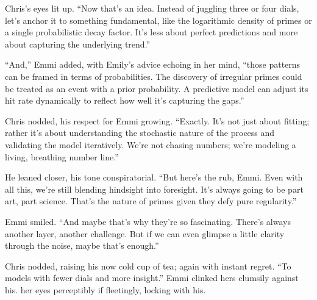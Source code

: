 Chris’s eyes lit up. “Now that’s an idea. Instead of juggling three or four dials, let’s anchor it to something fundamental, like the logarithmic density of primes or a single probabilistic decay factor. It’s less about perfect predictions and more about capturing the underlying trend.”

“And,” Emmi added, with Emily’s advice echoing in her mind, “those patterns can be framed in terms of probabilities. The discovery of irregular primes could be treated as an event with a prior probability. A predictive model can adjust its hit rate dynamically to reflect how well it’s capturing the gaps.”

Chris nodded, his respect for Emmi growing. “Exactly. It’s not just about fitting; rather it’s about understanding the stochastic nature of the process and validating the model iteratively. We’re not chasing numbers; we’re modeling a living, breathing number line.”

He leaned closer, his tone conspiratorial. “But here’s the rub, Emmi. Even with all this, we’re still blending hindsight into foresight. It’s always going to be part art, part science. That’s the nature of primes given they defy pure regularity.”

Emmi smiled. “And maybe that’s why they’re so fascinating. There’s always another layer, another challenge. But if we can even glimpse a little clarity through the noise, maybe that’s enough.”

Chris nodded, raising his now cold cup of tea; again with instant regret. “To models with fewer dials and more insight.” Emmi clinked hers clumsily against his. her eyes perceptibly if fleetingly, locking with his.






